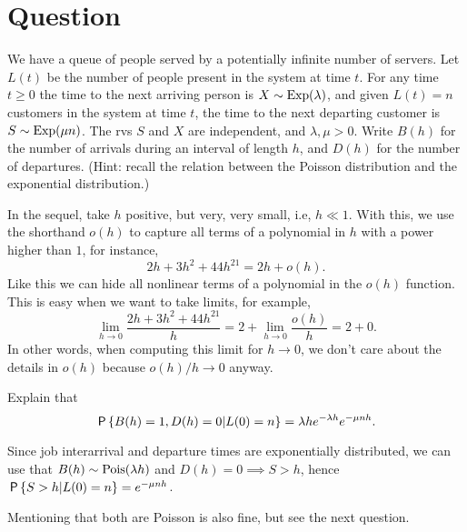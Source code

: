 \section*{Question}


We have a queue of people served by a potentially infinite number of servers. Let $L(t)$ be the number of people present in the system at time $t$.
For any time $t\geq 0$ the time to the next arriving person is $X\sim\Exp{\lambda}$, and given $L(t)=n$ customers in the system at time $t$, the time to the next departing customer is $S\sim\Exp{\mu n}$. The rvs $S$ and $X$ are independent, and $\lambda, \mu > 0$. Write $B(h)$ for the number of arrivals during an interval of length $h$, and $D(h)$ for the number of departures. (Hint: recall the relation between the Poisson distribution and the exponential distribution.)

In the sequel, take $h$ positive, but very, very small, i.e, $h\ll 1$. With this, we use the shorthand $o(h)$ to capture all terms of a polynomial in $h$ with a power higher than $1$, for instance,
\begin{equation}
  2h + 3 h^2+ 44 h^{21} = 2h + o(h).
\end{equation}
Like this we can hide all nonlinear terms of a polynomial  in the $o(h)$ function. This is easy when we want to take limits, for example,
\begin{equation}
  \lim_{h\to 0} \frac{2h + 3h^{2} + 44 h^{21}} h
= 2 +  \lim_{h\to 0} \frac{o(h)} h  = 2 + 0.
\end{equation}
In other words, when computing this limit for $h\to 0$, we don't care about the details in $o(h)$ because $o(h)/h\to0$ anyway.

\begin{exercise}[1]
Explain that
\begin{equation}
\P{B(h)=1, D(h)=0|L(0) = n } = \lambda h e^{-\lambda h} e^{-\mu n h}.
\end{equation}
\begin{solution}
  Since job interarrival and departure times are exponentially distributed, we can use that $B(h) \sim \Pois{\lambda h}$ and $D(h) = 0 \implies S > h$, hence $\P{S>h|L(0) = n} = e^{-\mu n h}$.

Mentioning that both are Poisson is also fine, but see the next question.
\end{solution}
\end{exercise}

